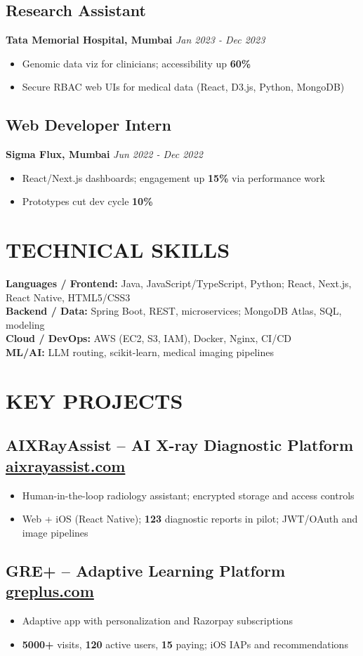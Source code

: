 \documentclass[10pt,a4paper]{article}
\newcommand{\experience}[4]{
    \subsection{#1}
    \textbf{#2} \hfill {\fontsize{9}{10}\selectfont\itshape #3}\\
    \vspace{-10pt}
    #4
}
\newcommand{\project}[3]{
    \subsection{#1 \hfill \textcolor{primary}{\textbf{#2}}}
    \vspace{-2pt}
    #3
}
\def\hfill{ }%
\begin{document}
\vspace{3pt}
\experience{Research Assistant}{Tata Memorial Hospital, Mumbai}{Jan 2023 - Dec 2023}{
\begin{itemize}
    \item Genomic data viz for clinicians; accessibility up \textbf{60\%}
    \item Secure RBAC web UIs for medical data (React, D3.js, Python, MongoDB)
\end{itemize}
}

\vspace{3pt}
\experience{Web Developer Intern}{Sigma Flux, Mumbai}{Jun 2022 - Dec 2022}{
\begin{itemize}
    \item React/Next.js dashboards; engagement up \textbf{15\%} via performance work
    \item Prototypes cut dev cycle \textbf{10\%}
\end{itemize}
}

\section{TECHNICAL SKILLS}
\vspace{2pt}
\textbf{Languages / Frontend:} Java, JavaScript/TypeScript, Python; React, Next.js, React Native, HTML5/CSS3\\
\textbf{Backend / Data:} Spring Boot, REST, microservices; MongoDB Atlas, SQL, modeling\\
\textbf{Cloud / DevOps:} AWS (EC2, S3, IAM), Docker, Nginx, CI/CD\\
\textbf{ML/AI:} LLM routing, scikit-learn, medical imaging pipelines

\section{KEY PROJECTS}
\vspace{2pt}
\project{AIXRayAssist -- AI X-ray Diagnostic Platform}{\href{https://aixrayassist.com}{aixrayassist.com}}{
\begin{itemize}
    \item Human-in-the-loop radiology assistant; encrypted storage and access controls
    \item Web + iOS (React Native); \textbf{123} diagnostic reports in pilot; JWT/OAuth and image pipelines
\end{itemize}
}

\vspace{3pt}
\project{GRE+ -- Adaptive Learning Platform}{\href{https://greplus.com}{greplus.com}}{
\begin{itemize}
    \item Adaptive app with personalization and Razorpay subscriptions
    \item \textbf{5000+} visits, \textbf{120} active users, \textbf{15} paying; iOS IAPs and recommendations
\end{itemize}
}
\end{document}
